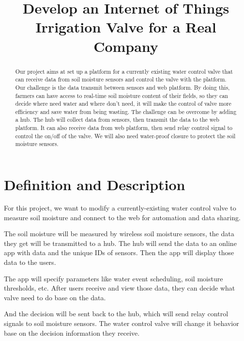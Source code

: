 \documentclass[10pt,onecolumn,journal,draftclsnofoot]{IEEEtran}
\begin{document}
\begin{titlepage}
\title{Develop an Internet of Things Irrigation Valve for a Real Company}
\author
{
}
	\maketitle
	\vspace{4cm}
	\begin{abstract}
		\noindent Our project aims at set up a platform for a currently existing water control valve that can receive data from soil moisture sensors and control the valve with the platform. Our challenge is the data transmit between sensors and web platform. By doing this, farmers can have access to real-time soil moisture content of their fields, so they can decide where need water and where don’t need, it will make the control of valve more efficiency and save water from being wasting.
    The challenge can be overcome by adding a hub. The hub will collect data from sensors, then transmit the data to the web platform. It can also receive data from web platform, then send relay control signal to control the on/off of the valve. We will also need water-proof closure to protect the soil moisture sensors.

	\end{abstract}

\end{titlepage}

\newpage

\section{Definition and Description}
\par
For this project, we want to modify a currently-existing water control valve to measure soil moisture and connect to the web for automation and data sharing.
\par
The soil moisture will be measured by wireless soil moisture sensors, the data they get will be transmitted to a hub. The hub will send the data to an online app with data and the unique IDs of sensors. Then the app will display those data to the users. 
\par
The app will specify parameters like water event scheduling, soil moisture thresholds, etc. After users receive and view those data, they can decide what valve need to do base on the data. 
\par
And the decision will be sent back to the hub, which will send relay control signals to soil moisture sensors. The water control valve will change it behavior base on the decision information they receive.
\end{document}
